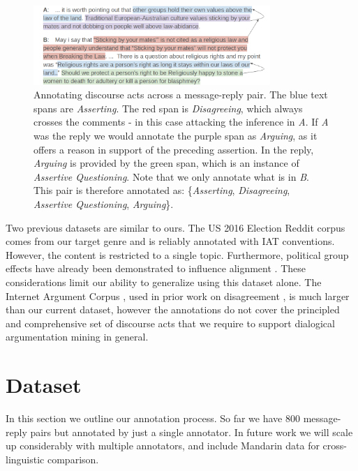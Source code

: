 \documentclass[11pt,a4paper]{article}
\begin{document}
\begin{figure}[t]
\centering
\includegraphics[width=0.8\textwidth]{annotate.png}
\caption{Annotating discourse acts across a message-reply pair. The blue text spans are \textit{Asserting}. The red span is \textit{Disagreeing}, which always crosses the comments - in this case attacking the inference in \textit{A}. If \textit{A} was the reply we would annotate the purple span as \textit{Arguing}, as it offers a reason in support of the preceding assertion. In the reply, \textit{Arguing} is provided by the green span, which is an instance of \textit{Assertive Questioning}. Note that we only annotate what is in \textit{B}. This pair is therefore annotated as: \{\textit{Asserting}, \textit{Disagreeing},  \textit{Assertive Questioning}, \textit{Arguing}\}.}
\end{figure}

Two previous datasets are similar to ours. The US 2016 Election Reddit corpus \cite{VisserKDKBR19} comes from our target genre and is reliably annotated with IAT conventions. However, the content is restricted to a single topic. Furthermore, political group effects have already been demonstrated to influence alignment \cite{ShinD18}. These considerations limit our ability to generalize using this dataset alone. The Internet Argument Corpus \cite{AbbottEAW16}, used in prior work on disagreement \cite{RosenthalM15}, is much larger than our current dataset, however the annotations do not cover the principled and comprehensive set of discourse acts that we require to support dialogical argumentation mining in general.

%

\section{Dataset}

In this section we outline our annotation process. So far we have $800$ message-reply pairs but annotated by just a single annotator. In future work we will scale up considerably with multiple annotators, and include Mandarin data for cross-linguistic comparison.
\end{document}
